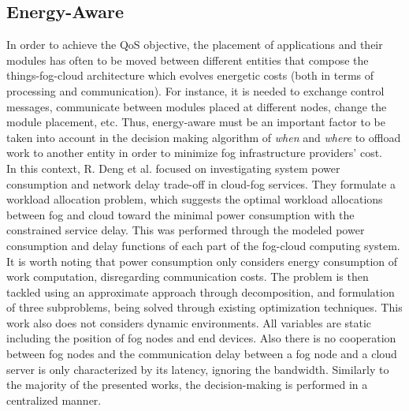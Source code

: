 
\subsection{Energy-Aware}\label{sec:energy}
In order to achieve the QoS objective, the placement of applications and their modules has often to be moved between different entities that compose the things-fog-cloud architecture which evolves energetic costs (both in terms of processing and communication). For instance, it is needed to exchange control messages, communicate between modules placed at different nodes, change the module placement, etc. Thus, energy-aware must be an important factor to be taken into account in the decision making algorithm of \textit{when} and \textit{where} to offload work to another entity in order to minimize fog infrastructure providers' cost.\\
\noindent\tab In this context, R. Deng et al. \cite{deng2016optimal} focused on investigating system power consumption and network delay trade-off in cloud-fog services. They formulate a workload allocation problem, which suggests the optimal workload allocations between fog and cloud toward the minimal power consumption with the constrained service delay. This was performed through the modeled power consumption and delay functions of each part of the fog-cloud computing system. It is worth noting that power consumption only considers energy consumption of work computation, disregarding communication costs. The problem is then tackled using an approximate approach through decomposition, and formulation of three subproblems, being solved through existing optimization techniques. This work also does not considers dynamic environments. All variables are static including the position of fog nodes and end devices. Also there is no cooperation between fog nodes and the communication delay between a fog node and a cloud server is only characterized by its latency, ignoring the bandwidth. Similarly to the majority of the presented works, the decision-making is performed in a centralized manner.\\
